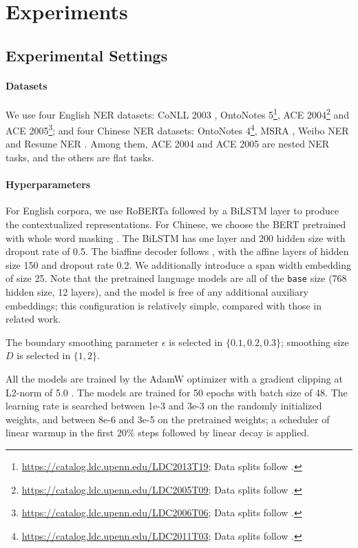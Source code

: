 \documentclass[11pt]{article}
\begin{document}
\section{Experiments} \label{sec:experiments}
\subsection{Experimental Settings}
\paragraph{Datasets} We use four English NER datasets: CoNLL 2003 \citep{tjong-kim-sang-veenstra-1999-representing}, OntoNotes 5\footnote{\url{https://catalog.ldc.upenn.edu/LDC2013T19}; Data splits follow \citet{pradhan-etal-2013-towards}.}, ACE 2004\footnote{\url{https://catalog.ldc.upenn.edu/LDC2005T09}; Data splits follow \citet{lu-roth-2015-joint}.} and ACE 2005\footnote{\url{https://catalog.ldc.upenn.edu/LDC2006T06}; Data splits follow \citet{lu-roth-2015-joint}.}; and four Chinese NER datasets: OntoNotes 4\footnote{\url{https://catalog.ldc.upenn.edu/LDC2011T03}; Data splits follow \citet{che-etal-2013-named}.}, MSRA \citep{levow-2006-third}, Weibo NER \citep{peng-dredze-2015-named} and Resume NER \citep{zhang-yang-2018-chinese}. Among them, ACE 2004 and ACE 2005 are nested NER tasks, and the others are flat tasks. 

\paragraph{Hyperparameters} For English corpora, we use RoBERTa \citep{liu2019roberta} followed by a BiLSTM layer to produce the contextualized representations. For Chinese, we choose the BERT pretrained with whole word masking \citep{cui2019pretraining}. The BiLSTM has one layer and 200 hidden size with dropout rate of 0.5. The biaffine decoder follows \citet{yu-etal-2020-named}, with the affine layers of hidden size 150 and dropout rate 0.2. We additionally introduce a span width embedding of size 25. Note that the pretrained language models are all of the \texttt{base} size (768 hidden size, 12 layers), and the model is free of any additional auxiliary embeddings; this configuration is relatively simple, compared with those in related work. 

The boundary smoothing parameter $\epsilon$ is selected in $\{0.1, 0.2, 0.3\}$; smoothing size $D$ is selected in $\{1, 2\}$. 

All the models are trained by the AdamW optimizer \citep{loshchilov2018decoupled} with a gradient clipping at L2-norm of 5.0 \citep{pascanu2013difficulty}. The models are trained for 50 epochs with batch size of 48. The learning rate is searched between 1e-3 and 3e-3 on the randomly initialized weights, and between 8e-6 and 3e-5 on the pretrained weights; a scheduler of linear warmup in the first 20\% steps followed by linear decay is applied. 
\end{document}
